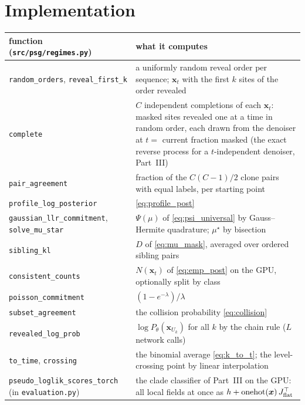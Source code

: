 \section{Implementation}\label{sec:dr_impl}
\begin{center}\footnotesize
\begin{tabular}{p{4.6cm}p{9.6cm}}
\toprule
function (\texttt{src/psg/regimes.py}) & what it computes\\
\midrule
\texttt{random\_orders}, \texttt{reveal\_first\_k} & a uniformly random reveal order per sequence; $\bm x_t$ with the first $k$ sites of the order revealed\\
\texttt{complete} & $C$ independent completions of each $\bm x_t$: masked sites revealed one at a time in random order,
each drawn from the denoiser at $t=$ current fraction masked (the exact reverse process for a $t$-independent denoiser, Part~III)\\
\texttt{pair\_agreement} & fraction of the $C(C-1)/2$ clone pairs with equal labels, per starting point\\
\texttt{profile\_log\_posterior} & \eqref{eq:profile_post}\\
\texttt{gaussian\_llr\_commitment}, \texttt{solve\_mu\_star} & $\Psi(\mu)$ of \eqref{eq:psi_universal} by Gauss--Hermite quadrature; $\mu^\star$ by bisection\\
\texttt{sibling\_kl} & $D$ of \eqref{eq:mu_mask}, averaged over ordered sibling pairs\\
\texttt{consistent\_counts} & $N(\bm x_t)$ of \eqref{eq:emp_post} on the GPU, optionally split by class\\
\texttt{poisson\_commitment} & $(1-e^{-\lambda})/\lambda$\\
\texttt{subset\_agreement} & the collision probability \eqref{eq:collision}\\
\texttt{revealed\_log\_prob} & $\log P_\theta(\bm x_{U_k})$ for all $k$ by the chain rule ($L$ network calls)\\
\texttt{to\_time}, \texttt{crossing} & the binomial average \eqref{eq:k_to_t}; the level-crossing point by linear interpolation\\
\texttt{pseudo\_loglik\_scores\_torch} (in \texttt{evaluation.py}) & the clade classifier of Part~III on the GPU: all local fields at once as
$h+\mathrm{onehot}(\bm x)\,J_{\rm flat}^\top$\\
\bottomrule
\end{tabular}
\end{center}

